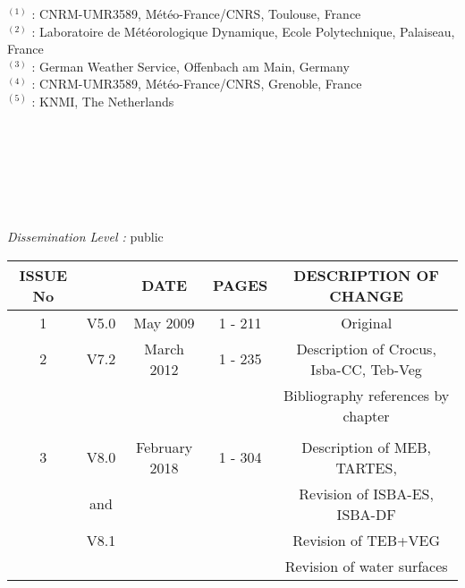 \documentclass[11pt]{book}
\begin{document}
{{$^{(1)}$ : CNRM-UMR3589, M\'et\'eo-France/CNRS, Toulouse, France \\ 
$^{(2)}$ : Laboratoire de M\'et\'eorologique Dynamique, Ecole Polytechnique, Palaiseau, France \\ 
$^{(3)}$ : German Weather Service, Offenbach am Main, Germany  \\ 
$^{(4)}$ : CNRM-UMR3589, M\'et\'eo-France/CNRS, Grenoble, France \\ 
$^{(5)}$ : KNMI, The Netherlands

~\\ \\ \\ \\ \\ \\ 

{\it{Dissemination Level :}} public


}}

\newpage
\begin{tabular}{|c|c|c|c|c|}
\hline
ISSUE No       &   &      DATE           &      PAGES      &         DESCRIPTION OF CHANGE                        \\
\hline
   1           & V5.0  &      May 2009       &      1 - 211    &         Original                                 \\
\hline
   2           & V7.2  &      March 2012     &      1 - 235    &         Description of Crocus, Isba-CC, Teb-Veg  \\
               &       &                     &                 &         Bibliography references by chapter       \\
               &       &                     &                 &                                                  \\
\hline
   3           & V8.0  &      February 2018  &      1 - 304    &         Description of MEB, TARTES,              \\
               & and   &                     &                 &         Revision of ISBA-ES, ISBA-DF             \\
               & V8.1  &                     &                 &         Revision of TEB+VEG                      \\
               &       &                     &                 &         Revision of water surfaces               \\
\hline
\end{tabular}
\newpage
\dominitoc
\tableofcontents
\end{document}

